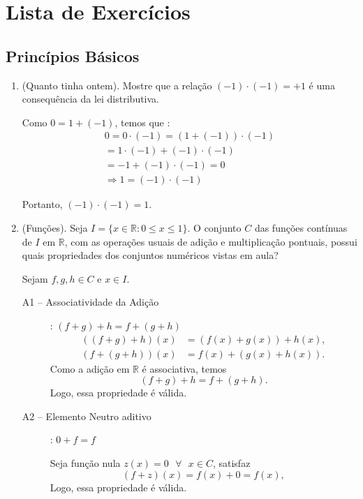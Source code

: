 \section{Lista de Exercícios}

\subsection{Princípios Básicos}

\begin{enumerate}[label=1.\arabic*.]

\item (Quanto tinha ontem). Mostre que a relação $(-1)\cdot(-1)=+1$ é uma consequência 
da lei distributiva.

Como $0=1+(-1)$, temos que :
\begin{gather*}
    0 = 0\cdot(-1) = (1+(-1))\cdot(-1) \\
    = 1\cdot(-1) + (-1)\cdot(-1) \\
    = -1 + (-1)\cdot(-1) = 0 \\
    \Rightarrow 1 = (-1)\cdot(-1)
\end{gather*}

Portanto, $(-1)\cdot(-1)=1$.

\item (Funções). Seja $I=\{x\in\mathbb{R}:0\le x\le 1\}$. O conjunto $C$ das funções 
contínuas de $I$ em $\mathbb{R}$, com as operações usuais de adição e multiplicação 
pontuais, possui quais propriedades dos conjuntos numéricos vistas em aula?

Sejam $f,g,h \in C$ e $x \in I$.

\begin{description}
    \item[A1 -- Associatividade da Adição] : $(f+g)+h = f+(g+h)$  
    \begin{align*}
    ((f+g)+h)(x) &= (f(x)+g(x)) + h(x), \\
    (f+(g+h))(x) &= f(x) + (g(x)+h(x)).
    \end{align*}
    Como a adição em $\mathbb{R}$ é associativa, temos
    \[
    (f+g)+h = f+(g+h).
    \]
    Logo, essa propriedade é válida.

    \item[A2 -- Elemento Neutro aditivo] : $0 + f = f$  
    
    Seja função nula $z(x) = 0 \text{ } \forall \text{ } x \in C$, satisfaz
    \[
    (f+z)(x) = f(x) + 0 = f(x),
    \]
    Logo, essa propriedade é válida. 


\end{description}
\end{enumerate}
